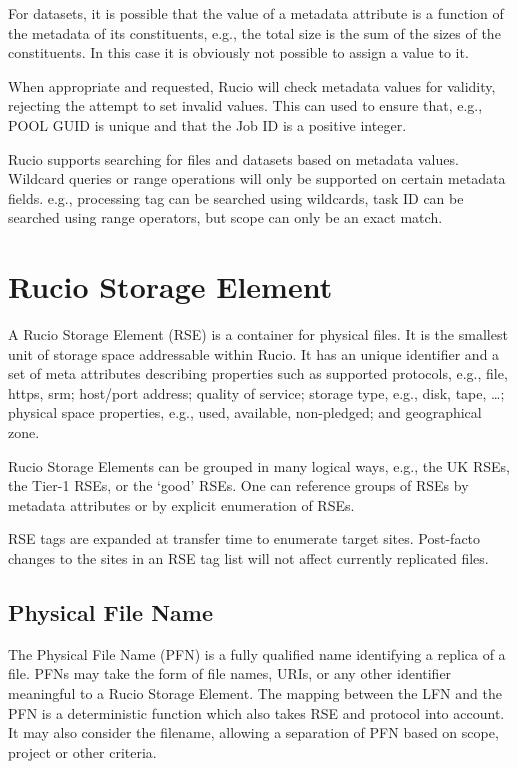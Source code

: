 \documentclass{atlasnote}
\begin{document}
For datasets, it is possible that the value of a metadata attribute is
a function of the metadata of its constituents, e.g., the total size
is the sum of the sizes of the constituents. In this case it is
obviously not possible to assign a value to it.

When appropriate and requested, Rucio will check metadata values for
validity, rejecting the attempt to set invalid values. This can used
to ensure that, e.g., POOL GUID is unique and that the Job ID is a
positive integer.

Rucio supports searching for files and datasets based on metadata
values. Wildcard queries or range operations will only be supported on
certain metadata fields. e.g., processing tag can be searched using
wildcards, task ID can be searched using range operators, but scope
can only be an exact match.


\section{Rucio Storage Element}
\label{overview_Rucio_Storage_Element:rucio-storage-element}\label{overview_Rucio_Storage_Element::doc}
A Rucio Storage Element (RSE) is a container for physical files. It is
the smallest unit of storage space addressable within Rucio. It has an
unique identifier and a set of meta attributes describing properties
such as supported protocols, e.g., file, https, srm; host/port
address; quality of service; storage type, e.g., disk, tape, \dots;
physical space properties, e.g., used, available, non-pledged; and geographical zone.

Rucio Storage Elements can be grouped in many logical ways, e.g., the
UK RSEs, the Tier-1 RSEs, or the `good' RSEs. One can reference groups of
RSEs by metadata attributes or by explicit enumeration of RSEs.

RSE tags are expanded at transfer time to enumerate target
sites. Post-facto changes to the sites in an RSE tag list will not
affect currently replicated files.


\subsection{Physical File Name}
\label{overview_Rucio_Storage_Element:physical-file-name}
The Physical File Name (PFN) is a fully qualified name identifying a
replica of a file. PFNs may take the form of file names, URIs, or any
other identifier meaningful to a Rucio Storage Element. The mapping
between the LFN and the PFN is a deterministic function which also
takes RSE and protocol into account. It may also consider the
filename, allowing a separation of PFN based on scope, project or
other criteria.
\end{document}

